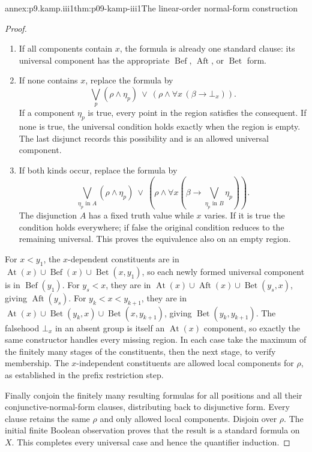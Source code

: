 \begin{annexitem}{annex:p9.kamp.iii1}{thm:p09-kamp-iii1}{The linear-order normal-form construction}
\begin{proof}
\begin{enumerate}
\item If all components contain \(x\), the formula is already one standard
      clause: its universal component has the appropriate
      \(\operatorname{Bef}\), \(\operatorname{Aft}\), or
      \(\operatorname{Bet}\) form.
\item If none contains \(x\), replace the formula by
      \[
       \bigvee_p(\rho\land\eta_p)
       \ \lor\
       \left(\rho\land\forall x\,(\beta\longrightarrow\bot_x)\right).
      \]
      If a component \(\eta_p\) is true, every point in the region satisfies
      the consequent.  If none is true, the universal condition holds
      exactly when the region is empty.  The last disjunct records this
      possibility and is an allowed universal component.
\item If both kinds occur, replace the formula by
      \[
       \bigvee_{\eta_p\text{ in }A}(\rho\land\eta_p)
       \ \lor\
       \left(\rho\land\forall x\left(
          \beta\longrightarrow\bigvee_{\eta_p\text{ in }B}\eta_p
       \right)\right).
      \]
      The disjunction \(A\) has a fixed truth value while \(x\) varies.
      If it is true the condition holds everywhere; if false the original
      condition reduces to the remaining universal.  This proves the
      equivalence also on an empty region.
\end{enumerate}

For \(x<y_1\), the \(x\)-dependent constituents are in
\(\operatorname{At}(x)\cup\operatorname{Bef}(x)
\cup\operatorname{Bet}(x,y_1)\), so each newly formed universal
component is in \(\operatorname{Bef}(y_1)\).
For \(y_s<x\), they are in
\(\operatorname{At}(x)\cup\operatorname{Aft}(x)
\cup\operatorname{Bet}(y_s,x)\), giving
\(\operatorname{Aft}(y_s)\).
For \(y_k<x<y_{k+1}\), they are in
\(\operatorname{At}(x)\cup\operatorname{Bet}(y_k,x)
\cup\operatorname{Bet}(x,y_{k+1})\), giving
\(\operatorname{Bet}(y_k,y_{k+1})\).
The falsehood \(\bot_x\) in an absent group is itself an
\(\operatorname{At}(x)\) component, so exactly the same constructor
handles every missing region.  In each case take the maximum of the finitely
many stages of the constituents, then the next stage, to verify membership.
The \(x\)-independent constituents are allowed local components for
\(\rho\), as established in the prefix restriction step.

Finally conjoin the finitely many resulting formulas for all positions and
all their conjunctive-normal-form clauses, distributing back to disjunctive
form.  Every clause retains the same \(\rho\) and only allowed local
components.  Disjoin over \(\rho\).  The initial finite Boolean
observation proves that the result is a standard formula on \(X\).
This completes every universal case and hence the quantifier induction.


\end{proof}
\end{annexitem}
